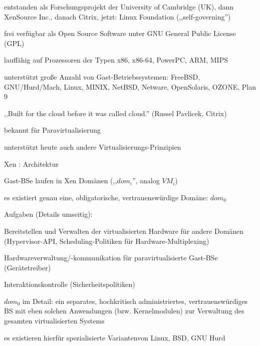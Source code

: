 \documentclass[a4paper]{article}
\begin{document}
\begin{multicols}{3}
    \begin{itemize*}
        \item entstanden als Forschungsprojekt der University of Cambridge (UK),
        dann XenSource Inc., danach Citrix, jetzt: Linux Foundation
        (,,self-governing'')
        \item frei verfügbar als Open Source Software unter GNU General Public
        License (GPL)
        \item lauffähig auf Prozessoren der Typen x86, x86-64, PowerPC, ARM, MIPS
        \item unterstützt große Anzahl von Gast-Betriebssystemen: FreeBSD,
        GNU/Hurd/Mach, Linux, MINIX, NetBSD, Netware, OpenSolaris, OZONE, Plan
        9
        \item ,,Built for the cloud before it was called cloud.'' (Russel Pavlicek,
        Citrix)
        \item bekannt für Paravirtualisierung
        \item unterstützt heute auch andere Virtualisierungs-Prinzipien
    \end{itemize*}

    Xen : Architektur

    \begin{itemize*}
        \item Gast-BSe laufen in Xen Domänen (,,$dom_i$'', analog $VM_i$)
        \item es existiert genau eine, obligatorische, vertrauenswürdige Domäne:
        $dom_0$
        \item Aufgaben (Details umseitig):
        \begin{itemize*}
            \item Bereitstellen und Verwalten der virtualisierten Hardware für andere Domänen (Hypervisor-API, Scheduling-Politiken für Hardware-Multiplexing)
            \item Hardwareverwaltung/-kommunikation für paravirtualisierte Gast-BSe (Gerätetreiber)
            \item Interaktionskontrolle (Sicherheitspolitiken)
        \end{itemize*}
        \item $dom_0$ im Detail: ein separates, hochkritisch administriertes,
        vertrauenswürdiges BS mit eben solchen Anwendungen (bzw.
        Kernelmodulen) zur Verwaltung des gesamten virtualisierten Systems
        \begin{itemize*}
            \item es existieren hierfür spezialisierte Variantenvon Linux, BSD, GNU Hurd
        \end{itemize*}
    \end{itemize*}


\end{multicols}
\end{document}
